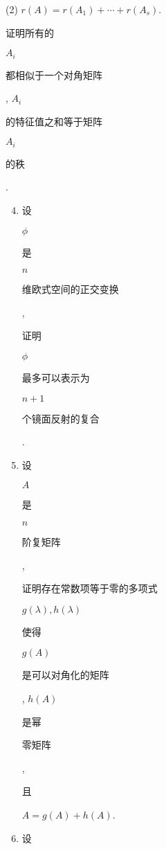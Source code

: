 \documentclass[10pt]{article}
\begin{document}
(2) $r(A)=r\left(A_{1}\right)+\cdots+r\left(A_{s}\right)$.

\begin{CJK}{UTF8}{mj}证明所有的\end{CJK} $A_{i}$ \begin{CJK}{UTF8}{mj}都相似于一个对角矩阵\end{CJK}, $A_{i}$ \begin{CJK}{UTF8}{mj}的特征值之和等于矩阵\end{CJK} $A_{i}$ \begin{CJK}{UTF8}{mj}的秩\end{CJK}.

\begin{enumerate}
  \setcounter{enumi}{3}
  \item \begin{CJK}{UTF8}{mj}设\end{CJK} $\phi$ \begin{CJK}{UTF8}{mj}是\end{CJK} $n$ \begin{CJK}{UTF8}{mj}维欧式空间的正交变换\end{CJK}, \begin{CJK}{UTF8}{mj}证明\end{CJK} $\phi$ \begin{CJK}{UTF8}{mj}最多可以表示为\end{CJK} $n+1$ \begin{CJK}{UTF8}{mj}个镜面反射的复合\end{CJK}.

  \item \begin{CJK}{UTF8}{mj}设\end{CJK} $A$ \begin{CJK}{UTF8}{mj}是\end{CJK} $n$ \begin{CJK}{UTF8}{mj}阶复矩阵\end{CJK}, \begin{CJK}{UTF8}{mj}证明存在常数项等于零的多项式\end{CJK} $g(\lambda), h(\lambda)$ \begin{CJK}{UTF8}{mj}使得\end{CJK} $g(A)$ \begin{CJK}{UTF8}{mj}是可以对角化的矩阵\end{CJK}, $h(A)$ \begin{CJK}{UTF8}{mj}是幂\end{CJK} \begin{CJK}{UTF8}{mj}零矩阵\end{CJK}, \begin{CJK}{UTF8}{mj}且\end{CJK} $A=g(A)+h(A)$.

  \item \begin{CJK}{UTF8}{mj}设\end{CJK}

\end{enumerate}
\end{document}
